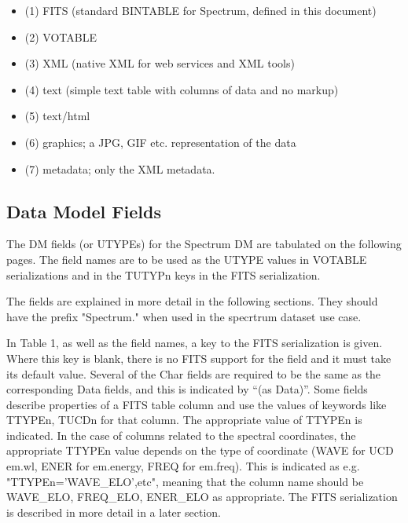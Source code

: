 \documentclass[11pt]{article}
\begin{document}
\colorbox{ipink}{
\begin{minipage}{0.9\textwidth}
\begin{itemize}
\item (1) FITS (standard BINTABLE for Spectrum, defined in this document)
\item (2) VOTABLE  
\item (3) XML  (native XML for web services and XML tools)
\item (4) text  (simple text table with columns of data and no markup)
\item (5) text/html
\item (6) graphics; a JPG, GIF etc. representation of the data
\item (7) metadata; only the XML metadata.

\end{itemize}
\end{minipage}
}

\subsection{Data Model Fields}

The DM fields (or UTYPEs) for the Spectrum DM are tabulated on the following 
pages. The field names are to be used as the UTYPE values in VOTABLE serializations
and in the TUTYPn keys in the FITS serialization.

The fields are explained in more detail in the following
sections. They should have the prefix "Spectrum." when used in the specrtrum dataset use case.

In Table 1, as well as the field names, a key to the FITS serialization is given.
Where this key is blank, there is no FITS support for the field and it must take its default value.
Several of the Char fields are required to be the same as the corresponding Data fields,
and this is indicated by ``(as Data)''. Some fields describe properties of a FITS table
column and use the values of keywords like TTYPEn, TUCDn for that column.
The appropriate value of TTYPEn is indicated. In the case of columns related to
the spectral coordinates, the appropriate TTYPEn value depends on the type of coordinate
(WAVE for UCD em.wl, ENER for em.energy, FREQ for em.freq). This is indicated as
e.g. "TTYPEn='WAVE\_ELO',etc", meaning that the column name should be WAVE\_ELO, FREQ\_ELO,
ENER\_ELO as appropriate.
The FITS serialization is described in more detail in a later section.

\clearpage
\end{document}

